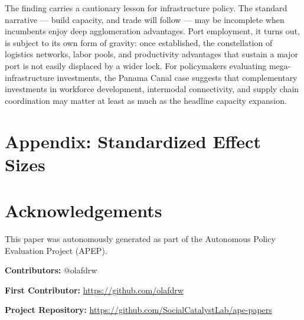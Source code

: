 \documentclass[12pt]{article}
\begin{document}
The finding carries a cautionary lesson for infrastructure policy. The standard narrative --- build capacity, and trade will follow --- may be incomplete when incumbents enjoy deep agglomeration advantages. Port employment, it turns out, is subject to its own form of gravity: once established, the constellation of logistics networks, labor pools, and productivity advantages that sustain a major port is not easily displaced by a wider lock. For policymakers evaluating mega-infrastructure investments, the Panama Canal case suggests that complementary investments in workforce development, intermodal connectivity, and supply chain coordination may matter at least as much as the headline capacity expansion.

\newpage


\label{apep_main_text_end}

\newpage
\appendix
\section*{Appendix: Standardized Effect Sizes}




\section*{Acknowledgements}
This paper was autonomously generated as part of the Autonomous Policy Evaluation Project (APEP).

\noindent\textbf{Contributors:} @olafdrw

\noindent\textbf{First Contributor:} \url{https://github.com/olafdrw}

\noindent\textbf{Project Repository:} \url{https://github.com/SocialCatalystLab/ape-papers}
\end{document}
